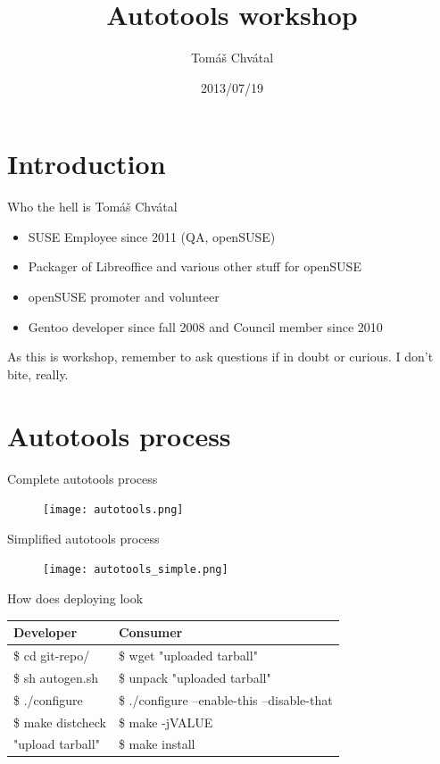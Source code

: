 \documentclass{beamer}
\author{Tom\'{a}\v{s} Chv\'{a}tal\newline {\small openSUSE Team}}
\title{Autotools workshop}
\date{2013/07/19}
\begin{document}
\begin{frame}[t,plain]
\titlepage
\end{frame}

\section{Introduction}

\begin{frame}[t]{Who the hell is Tomáš Chvátal}
	\begin{itemize}
	\item SUSE Employee since 2011 (QA, openSUSE)
	\item Packager of Libreoffice and various other stuff for openSUSE
	\item openSUSE promoter and volunteer
	\item Gentoo developer since fall 2008 and Council member since 2010
	\end{itemize}
	\begin{center}As this is workshop, remember to ask questions if in doubt or curious. I don't bite, really.\end{center}
\end{frame}

\section{Autotools process}

\begin{frame}{Complete autotools process}
	\begin{figure}
	\texttt{[image: autotools.png]}
	\end{figure}
\end{frame}

\begin{frame}{Simplified autotools process}
	\begin{figure}
	\texttt{[image: autotools\_simple.png]}
	\end{figure}
\end{frame}

\begin{frame}{How does deploying look}
	\begin{tabular}{|l|l|}
	\toprule
	Developer & Consumer \\
	\midrule
	\$ cd git-repo/ & \$ wget "uploaded tarball" \\
	\$ sh autogen.sh & \$ unpack "uploaded tarball" \\
	\$ ./configure & \$ ./configure --enable-this --disable-that \\
	\$ make distcheck & \$ make -jVALUE \\
	"upload tarball" & \$ make install \\
	\bottomrule
	\end{tabular}
\end{frame}
\end{document}
